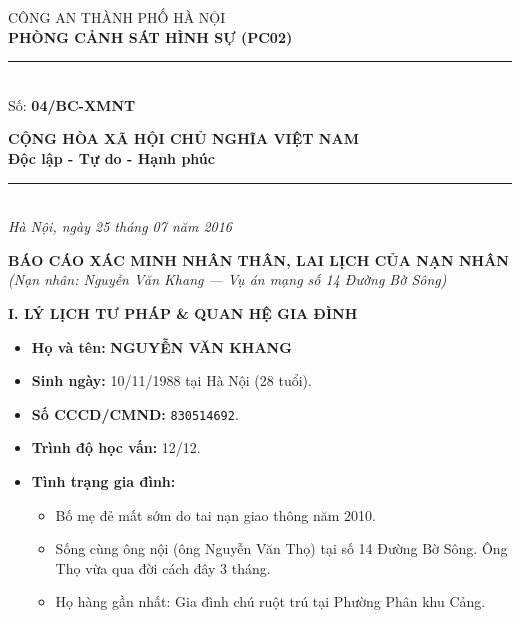 \documentclass[12pt,a4paper]{article}
\begin{document}
\noindent
\begin{minipage}[t]{0.46\textwidth}
    \begin{center}
        \fontsize{11pt}{13pt}\selectfont
        CÔNG AN THÀNH PHỐ HÀ NỘI\\
        \textbf{PHÒNG CẢNH SÁT HÌNH SỰ (PC02)}\\[-0.2em]
        \rule{3.2cm}{0.6pt}\\[0.25cm]
        \fontsize{11pt}{13pt}\selectfont Số: \textbf{04/BC-XMNT}
    \end{center}
\end{minipage}
\hfill
\begin{minipage}[t]{0.52\textwidth}
    \begin{center}
        \fontsize{11pt}{13pt}\selectfont
        \textbf{CỘNG HÒA XÃ HỘI CHỦ NGHĨA VIỆT NAM}\\
        \textbf{Độc lập - Tự do - Hạnh phúc}\\[-0.2em]
        \rule{3.6cm}{0.6pt}\\[0.25cm]
        \textit{Hà Nội, ngày 25 tháng 07 năm 2016}
    \end{center}
\end{minipage}

\vspace{0.5cm}

\begin{center}
    \textbf{\Large BÁO CÁO XÁC MINH NHÂN THÂN, LAI LỊCH CỦA NẠN NHÂN}\\[0.15cm]
    \textit{(Nạn nhân: Nguyễn Văn Khang — Vụ án mạng số 14 Đường Bờ Sông)}
\end{center}

\vspace{0.3cm}



\vspace{0.3cm}\noindent\textbf{\large I. LÝ LỊCH TƯ PHÁP \& QUAN HỆ GIA ĐÌNH}\\[0.15cm]

\begin{itemize}[leftmargin=*, itemsep=2pt, topsep=2pt, parsep=0pt]
  \item \textbf{Họ và tên:} \textbf{NGUYỄN VĂN KHANG}
  \item \textbf{Sinh ngày:} 10/11/1988 tại Hà Nội (28 tuổi).
  \item \textbf{Số CCCD/CMND:} \texttt{830514692}.
  \item \textbf{Trình độ học vấn:} 12/12.
  \item \textbf{Tình trạng gia đình:}
\begin{itemize}[leftmargin=*, itemsep=2pt, topsep=2pt, parsep=0pt]
  \item Bố mẹ đẻ mất sớm do tai nạn giao thông năm 2010.
  \item Sống cùng ông nội (ông Nguyễn Văn Thọ) tại số 14 Đường Bờ Sông. Ông Thọ vừa qua đời cách đây 3 tháng.
  \item Họ hàng gần nhất: Gia đình chú ruột trú tại Phường Phân khu Cảng.


\end{itemize}
\end{itemize}
\end{document}
